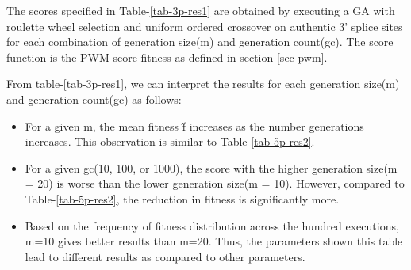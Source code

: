 The scores specified in Table-\ref{tab-3p-res1} are obtained by executing a GA with roulette wheel selection and uniform ordered crossover on authentic 3' splice sites for each combination of generation size(m) and generation count(gc). The score function is the PWM score fitness as defined in section-\ref{sec-pwm}.  \par
From table-\ref{tab-3p-res1}, we can interpret the results for each generation size(m) and generation count(gc) as follows:
\begin{itemize}
	\item For a given m, the mean fitness \^{f} increases as the number generations increases. This observation is similar to Table-\ref{tab-5p-res2}.
	\item For a given gc(10, 100, or 1000), the score with the higher generation size(m = 20) is worse than the lower generation size(m = 10). However, compared to Table-\ref{tab-5p-res2}, the reduction in fitness is significantly more.
	\item Based on the frequency of fitness distribution across the hundred executions, m=10 gives better results than m=20. Thus, the parameters shown this table lead to different results as compared to other parameters.
\end{itemize} 

